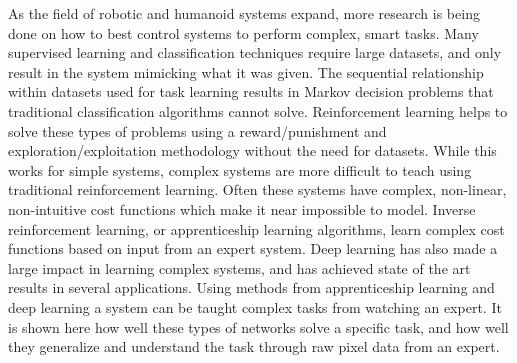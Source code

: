 \documentclass[12pt,american]{report}
\begin{document}
\begin{abstractpage}
As the field of robotic and humanoid systems expand, more research is being done on how to best control systems to perform complex, smart tasks. Many supervised learning and classification techniques require large datasets, and only result in the system mimicking what it was given. The sequential relationship within datasets used for task learning results in Markov decision problems that traditional classification algorithms cannot solve. Reinforcement learning helps to solve these types of problems using a reward/punishment and exploration/exploitation methodology without the need for datasets. While this works for simple systems, complex systems are more difficult to teach using traditional reinforcement learning. Often these systems have complex, non-linear, non-intuitive cost functions which make it near impossible to model.  Inverse reinforcement learning, or apprenticeship learning algorithms, learn complex cost functions based on input from an expert system. Deep learning has also made a large impact in learning complex systems, and has achieved state of the art results in several applications.  Using methods from apprenticeship learning and deep learning a system can be taught complex tasks from watching an expert.  It is shown here how well these types of networks solve a specific task, and how well they generalize and understand the task through raw pixel data from an expert.
\end{abstractpage}



\afterpreface%


\body%
\end{document}

